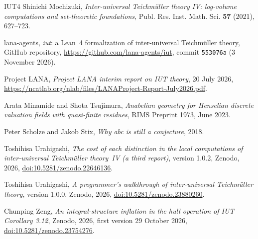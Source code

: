 \documentclass[11pt,a4paper]{article}
\theoremstyle{plain}
\theoremstyle{definition}
\theoremstyle{remark}
\begin{document}
\begin{thebibliography}{IUT4}
Shinichi Mochizuki, \emph{Inter-universal {T}eichm\"uller theory {IV}: log-volume computations and set-theoretic
foundations}, Publ. Res. Inst. Math. Sci. \textbf{57} (2021), 627--723.

lana-agents, \emph{iut}: a Lean~4 formalization of inter-universal {T}eichm\"uller theory, GitHub repository,
\url{https://github.com/lana-agents/iut}, commit \texttt{553076a} (3 November 2026).

Project LANA, \emph{Project LANA interim report on IUT theory}, 20 July 2026,
\url{https://ncatlab.org/nlab/files/LANAProject-Report-July2026.pdf}.

Arata Minamide and Shota Tsujimura, \emph{Anabelian geometry for {H}enselian discrete valuation fields with
quasi-finite residues}, RIMS Preprint 1973, June 2023.

Peter Scholze and Jakob Stix, \emph{Why abc is still a conjecture}, 2018.

Toshihisa Urahigashi, \emph{The cost of each distinction in the local computations of inter-universal
{T}eichm\"uller theory~{IV} (a third report)}, version 1.0.2, Zenodo, 2026,
\href{https://doi.org/10.5281/zenodo.22646136}{doi:10.5281/zenodo.22646136}.

Toshihisa Urahigashi, \emph{A programmer's walkthrough of inter-universal {T}eichm\"uller theory}, version 1.0.0,
Zenodo, 2026, \href{https://doi.org/10.5281/zenodo.23880260}{doi:10.5281/zenodo.23880260}.

Chunping Zeng, \emph{An integral-structure inflation in the hull operation of {IUT} {C}orollary 3.12}, Zenodo, 2026,
first version 29 October 2026, \href{https://doi.org/10.5281/zenodo.23754276}{doi:10.5281/zenodo.23754276}.
\end{thebibliography}
\end{document}
